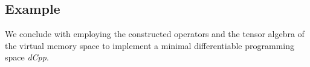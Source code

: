 \subsection{Example}

We conclude with employing the constructed operators and the tensor algebra of the virtual memory space to implement a minimal differentiable programming space \emph{dCpp}.

